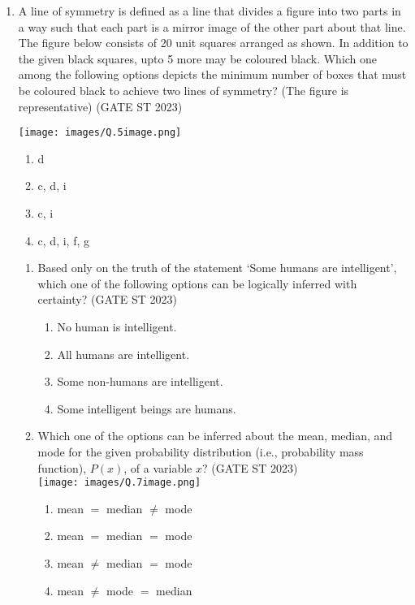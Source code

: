 \documentclass[journal]{IEEEtran}
\begin{document}
\begin{enumerate}[label=\textbf{Q.\arabic*.}, start=1, align=left, itemsep=2em]
\item A line of symmetry is defined as a line that divides a figure into two parts in a way such that each part is a mirror image of the other part about that line.\\

The figure below consists of 20 unit squares arranged as shown. In addition to the given black squares, upto 5 more may be coloured black. Which one among the following options depicts the minimum number of boxes that must be coloured black to achieve two lines of symmetry? (The figure is representative) \hfill(GATE ST 2023)

    \texttt{[image: images/Q.5image.png]}
   
\begin{enumerate}[label=(\Alph*)]
    \item d
    \item c, d, i
    \item c, i
    \item c, d, i, f, g
\end{enumerate}



\begin{enumerate}[label=\textbf{Q.\arabic*.}, start=6, align=left, itemsep=2em]

\item Based only on the truth of the statement `Some humans are intelligent', which one of the following options can be logically inferred with certainty? \hfill(GATE ST 2023)

\begin{enumerate}[label=(\Alph*)]
    \item No human is intelligent.
    \item All humans are intelligent.
    \item Some non-humans are intelligent.
    \item Some intelligent beings are humans.
\end{enumerate}

\item Which one of the options can be inferred about the mean, median, and mode for the given probability distribution (i.e., probability mass function), $P(x)$, of a variable $x$? \hfill(GATE ST 2023)\\[1em]

    \texttt{[image: images/Q.7image.png]}
    
\begin{enumerate}[label=(\Alph*)]
    \item mean $=$ median $\neq$ mode
    \item mean $=$ median $=$ mode
    \item mean $\neq$ median $=$ mode
    \item mean $\neq$ mode $=$ median
\end{enumerate}


\end{enumerate}
\end{enumerate}
\end{document}

